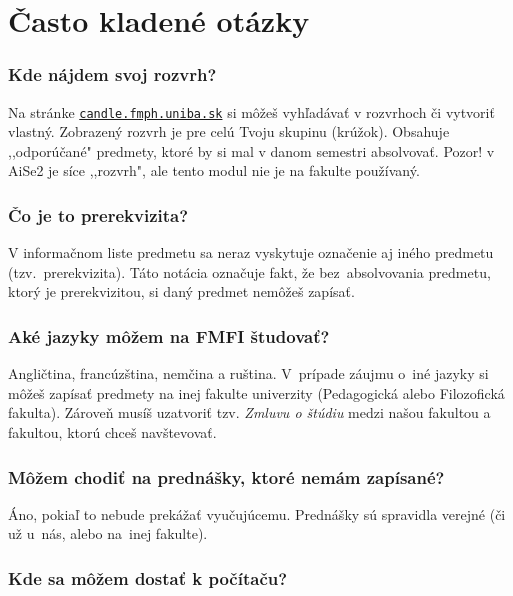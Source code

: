 \chapter{Často kladené otázky}


\subsection*{Kde nájdem svoj rozvrh?}

Na stránke \href{https://candle.fmph.uniba.sk}{\texttt{candle.fmph.uniba.sk}}
si môžeš vyhľadávať v rozvrhoch či vytvoriť vlastný. Zobrazený rozvrh je pre celú Tvoju skupinu (krúžok). Obsahuje ,,odporúčané" predmety, ktoré by si mal v danom semestri absolvovať. Pozor! v AiSe2 je síce ,,rozvrh", ale tento modul nie je na fakulte používaný.

\subsection*{Čo je to prerekvizita?}

V informačnom liste predmetu sa neraz vyskytuje označenie aj iného predmetu (tzv.\ prerekvizita). Táto notácia označuje fakt, že bez~absolvovania predmetu, ktorý je prerekvizitou, si daný predmet nemôžeš zapísať.


\subsection*{Aké jazyky môžem na FMFI študovať?}

Angličtina, francúzština, nemčina a ruština. V~prípade záujmu o~iné
jazyky si môžeš zapísať predmety na inej fakulte univerzity (Pedagogická
alebo Filozofická fakulta). Zároveň musíš uzatvoriť tzv. \emph{Zmluvu o štúdiu} medzi našou fakultou a fakultou, ktorú chceš navštevovať. 


\subsection*{Môžem chodiť na prednášky, ktoré nemám zapísané?}

Áno, pokiaľ to nebude prekážať vyučujúcemu. Prednášky sú spravidla ve\-rej\-né
(či už u~nás, alebo na~inej fakulte).


\subsection*{Kde sa môžem dostať k počítaču?}

